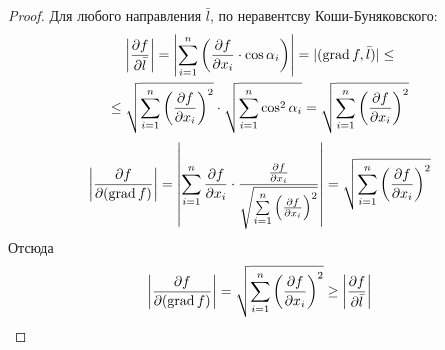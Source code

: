 \begin{proof}
    Для любого направления $\bar{l}$, по неравентсву Коши-Буняковского:
    \begin{multline*}
        \left|\frac{\partial {f}}{\partial {\bar{l}}}\right|=\left|\sum\limits_{i=1}^{n}\left(\frac{\partial {f}}{\partial {x_i}}\cdot \cos{\alpha_i}\right)\right|=|(\operatorname*{grad} f, \bar{l})|\leq \\
        \leq \sqrt{\sum\limits_{i=1}^{n}\left(\frac{\partial {f}}{\partial {x_i}}\right)^2}\cdot \sqrt{\sum\limits_{i=1}^{n}\cos^2\alpha_i}=\sqrt{\sum\limits_{i=1}^{n}\left(\frac{\partial {f}}{\partial {x_i}}\right)^2}
    \end{multline*} 
    \[\left|\frac{\partial {f}}{\partial {(\operatorname*{grad}{f})}}\right|=\left|\sum\limits_{i=1}^{n}\frac{\partial {f}}{\partial {x_i}}\cdot \frac{\frac{\partial {f}}{\partial {x_i}}}{\sqrt{\sum\limits_{i=1}^{n}\left(\frac{\partial {f}}{\partial {x_i}}\right)^2}}\right|=\sqrt{\sum\limits_{i=1}^{n}\left(\frac{\partial {f}}{\partial {x_i}}\right)^2}\]
    Отсюда
    \[\left|\frac{\partial {f}}{\partial {(\operatorname*{grad}{f})}}\right|=\sqrt{\sum\limits_{i=1}^{n}\left(\frac{\partial {f}}{\partial {x_i}}\right)^2}\geq \left|\frac{\partial {f}}{\partial {\bar{l}}}\right|\]

\end{proof} 
